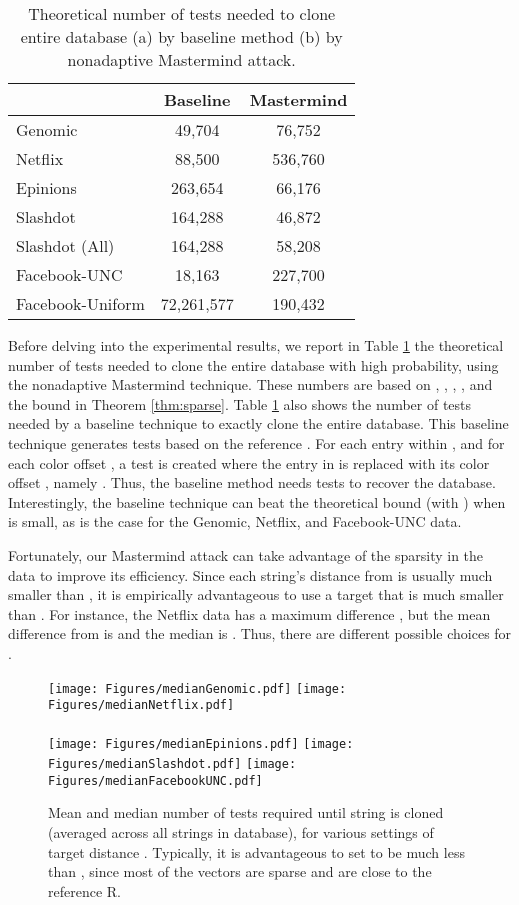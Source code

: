 \documentclass{article}
\begin{document}
\begin{table}
\caption{Theoretical number of tests needed to clone entire database (a) by baseline method 
(b) by nonadaptive Mastermind attack.}
\begin{center}
\begin{tabular}{l|c|c}
 & Baseline & Mastermind \\
\hline
Genomic & 49,704 & 76,752 \\
Netflix & 88,500 & 536,760\\
Epinions & 263,654 & 66,176 \\
Slashdot & 164,288 & 46,872  \\
Slashdot (All) & 164,288 & 58,208 \\
Facebook-UNC & 18,163 & 227,700 \\
Facebook-Uniform & 72,261,577 & 190,432 \\
\end{tabular}
\end{center}
\label{tbl:theoretical}
\end{table}

Before delving into the experimental results, we report in Table \ref{tbl:theoretical} the 
theoretical number of tests needed to clone the entire database with high probability, 
using the nonadaptive Mastermind technique.  These numbers are based on , , , , and the 
bound in Theorem \ref{thm:sparse}.  Table \ref{tbl:theoretical} also shows the number of tests needed 
by a baseline technique to exactly clone the entire database.  This baseline technique
generates tests based on the reference .  For each entry  within , 
and for each color offset , a test is created where the entry  in  is replaced 
with its color offset , namely .  Thus, the baseline method needs 
 tests to recover the database.  Interestingly,
the baseline technique can beat the theoretical bound (with ) when  is small, 
as is the case for the Genomic, Netflix, and Facebook-UNC data.

Fortunately, our Mastermind attack can take advantage of the sparsity in the 
data to improve its efficiency.  Since each string's distance from  is usually much smaller 
than , it is empirically advantageous to use a target  that is much smaller 
than .  For instance, the Netflix data has a maximum difference , but the mean 
difference from  is  and the median is 
.  Thus, there are different possible choices for .

\begin{figure*}
\centering
\texttt{[image: Figures/medianGenomic.pdf]} \qquad
\texttt{[image: Figures/medianNetflix.pdf]} \\ \quad \\
\texttt{[image: Figures/medianEpinions.pdf]} \quad
\texttt{[image: Figures/medianSlashdot.pdf]} \quad
\texttt{[image: Figures/medianFacebookUNC.pdf]} 
\caption{Mean and median number of tests required until string is cloned (averaged across all strings in database), for various settings of target distance . Typically, it is advantageous to 
set  to be much less than , since most of the vectors are sparse and are close to the reference R.}
\label{fig:target}
\end{figure*}
\end{document}
